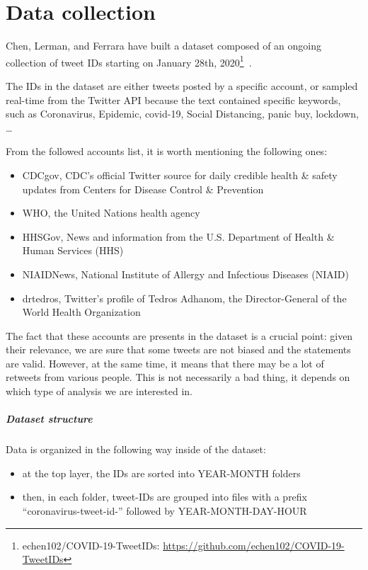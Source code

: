 \graphicspath{{chapters/chapter2/img/}}

\chapter{Data collection}
\label{cha:data}
Chen, Lerman, and Ferrara have built a dataset composed of an ongoing collection of tweet IDs starting on January 28th, 2020\footnote{echen102/COVID-19-TweetIDs: \url{https://github.com/echen102/COVID-19-TweetIDs}}~\cite{chen2020tracking}.

The IDs in the dataset are either tweets posted by a specific account, or sampled real-time from the Twitter API because the text contained specific keywords, such as Coronavirus, Epidemic, covid-19, Social Distancing, panic buy, lockdown, \ldots 

From the followed accounts list, it is worth mentioning the following ones:
\begin{itemize}
	\item CDCgov, CDC's official Twitter source for daily credible health \& safety updates from Centers for Disease Control \& Prevention
	\item WHO, the United Nations health agency
	\item HHSGov, News and information from the U.S. Department of Health \& Human Services (HHS)
	\item NIAIDNews, National Institute of Allergy and Infectious Diseases (NIAID)
	\item drtedros, Twitter's profile of Tedros Adhanom, the Director-General of the World Health Organization
\end{itemize}

The fact that these accounts are presents in the dataset is a crucial point: given their relevance, we are sure that some tweets are not biased and the statements are valid. However, at the same time, it means that there may be a lot of retweets from various people. This is not necessarily a bad thing, it depends on which type of analysis we are interested in.

\paragraph{Dataset structure}

Data is organized in the following way inside of the dataset:

\begin{itemize}
	\item at the top layer, the IDs are sorted into YEAR-MONTH folders
	\item then, in each folder, tweet-IDs are grouped into files with a prefix “coronavirus-tweet-id-” followed by YEAR-MONTH-DAY-HOUR
\end{itemize}


